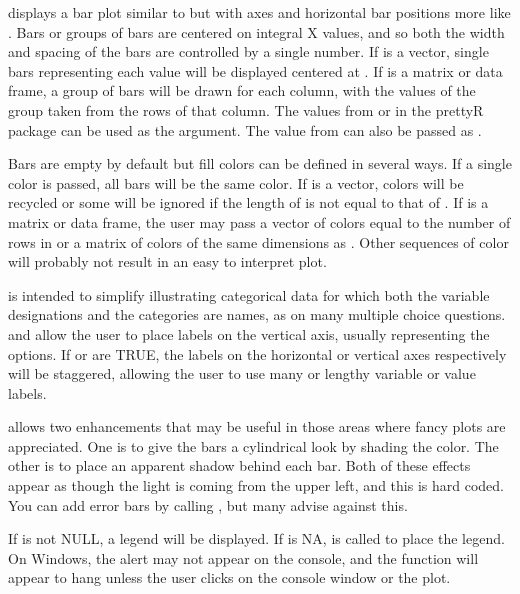 \begin{Details}\relax
{} displays a bar plot similar to  but with axes and
horizontal bar positions more like . Bars or groups of bars are
centered on integral X values, and so both the width and spacing of the bars
are controlled by a single number. If  is a vector, single bars
representing each value will be displayed centered at .
If  is a matrix or data frame, a group of bars will be drawn for
each column, with the values of the group taken from the rows of that column.
The values from  or  in the prettyR package can be
used as the  argument. The value from  can also be
passed as .

Bars are empty by default but fill colors can be defined in several ways.
If a single color is passed, all bars will be the same color. If 
is a vector, colors will be recycled or some will be ignored if the length of
 is
not equal to that of . If  is a matrix or data frame,
the user may pass a vector of colors equal to the number of rows in 
or a matrix of colors of the same dimensions as . Other sequences
of color will probably not result in an easy to interpret plot.

 is intended to simplify illustrating categorical data for which both
the variable designations and the categories are names, as on many multiple
choice questions.   and  allow the user to place
labels on the vertical axis, usually representing the options. If 
or  are TRUE, the labels on the horizontal or vertical axes
respectively will be staggered, allowing the user to use many or lengthy variable
or value labels.

 allows two enhancements that may be useful in those areas where fancy
plots are appreciated. One is to give the bars a cylindrical look by shading the
color. The other is to place an apparent shadow behind each bar. Both of these
effects appear as though the light is coming from the upper left, and this is
hard coded. You can add error bars by calling , but many advise against
this.

If  is not NULL, a legend will be displayed. If 
 is NA,  is called to place the legend. On 
Windows, the alert may not appear on the console, and the function will 
appear to hang unless the user clicks on the console window or the plot.
\end{Details}
